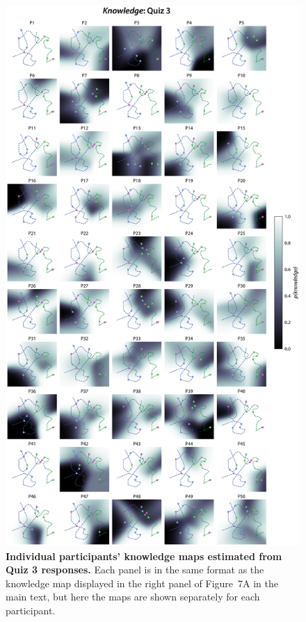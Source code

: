 \documentclass[10pt]{article}
\newcommand{\knowledgeMaps}{7}
\begin{document}
\begin{figure}[tp]
    \centering
    \includegraphics[height=0.9\textheight]{figs/individual-knowledge-maps-quiz3}
    
    \caption{\textbf{Individual participants' knowledge maps estimated from
    Quiz 3 responses.} Each panel is in the same format as the knowledge map
    displayed in the right panel of Figure~\knowledgeMaps A in the main text,
    but here the maps are shown separately for each participant.}
    
    \label{fig:knowledge-maps-q3}
\end{figure}
\end{document}
